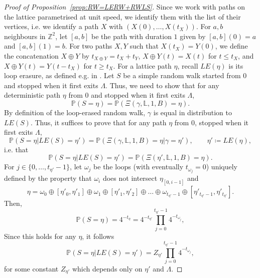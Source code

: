 \documentclass[11pt]{article}
\def\Att{{\Xi}}
\begin{document}
\begin{proof}[Proof of Proposition~\ref{prop:RW=LERW+RWLS}]
  Since we work with paths on the lattice parametrised at unit speed, we identify them with the list of their vertices, i.e. we identify a path $X$ with $(X(0), \dots, X(t_X))$. For $a,b$ neighbours in $\mathbb{Z}^2$, let $[a,b]$ be the path with duration $1$ given by $[a,b](0)=a$ and $[a,b](1)=b$. For two paths $X,Y$ such that $X(t_X)=Y(0)$, we define the concatenation $X\oplus Y$ by $t_{X\oplus Y}=t_X+t_Y$, $X\oplus Y(t)=X(t)$ for $t\leq t_X$, and $X\oplus Y(t)=Y(t-t_X)$ for $t\geq t_X$.
  For a lattice path $\eta$, recall $LE(\eta)$ is its loop erasure, as defined e.g. in  \cite{LawlerLimic}. Let $S$ be a simple random walk started from $0$ and stopped when it first exits $\Lambda$.
  Thus, we need to show that for any deterministic path $\eta$ from $0$ and stopped when it first exits $\Lambda$,
  \[
  \mathbb{P}(S=\eta)=\mathbb{P}( \Att(\gamma,\mathbb{L},1,B) =\eta ).
  \]
  By definition of the loop-erased random walk, $\gamma$ is equal in distribution to $LE(S)$. Thus, it suffices to prove that for any path $\eta$ from $0$, stopped when it first exits $\Lambda$,
  \[
  \mathbb{P}( S=\eta |LE(S)=\eta')= \mathbb{P}(\Att(\gamma,\mathbb{L},1,B)=\eta|
  \gamma= \eta' ), \qquad \eta'\coloneqq LE(\eta),
  \]
	i.e. that
	\[
	\mathbb{P}( S=\eta |LE(S)=\eta')= \mathbb{P}(\Att(\eta',\mathbb{L},1,B)=\eta ).
	\]
	For $j\in \{0, \dots, t_{\eta'}-1\}$, let $\omega_j$ be the loops (with eventually $t_{\omega_j}=0$) uniquely defined by the property that
  $\omega_i$ does not intersect $\eta_{[0,i-1]}$ and
  \[
  \eta= \omega_0\oplus [\eta'_0,\eta'_1]\oplus \omega_1\oplus[\eta'_1,\eta'_2] \oplus \dots \oplus \omega_{t_{\eta'}-1}\oplus [\eta'_{t_{\eta'}-1}, \eta'_{t_{\eta'}}].
  \]
  Then,
  \[
  \mathbb{P}( S=\eta)= 4^{-t_{\eta} }=4^{-t_{\eta'}} \prod_{j=0}^{t_{\eta'}-1 } 4^{-t_{\omega_j}},
  \]
  Since this holds for any $\eta$, it follows
  \[
  \mathbb{P}( S=\eta| LE(S)=\eta')= Z_{\eta'} \prod_{j=0}^{t_{\eta'}-1 } 4^{-t_{\omega_j}},
  \]
  for some constant $Z_{\eta'}$ which depends only on $\eta'$ and $\Lambda$.


\end{proof}
\end{document}
